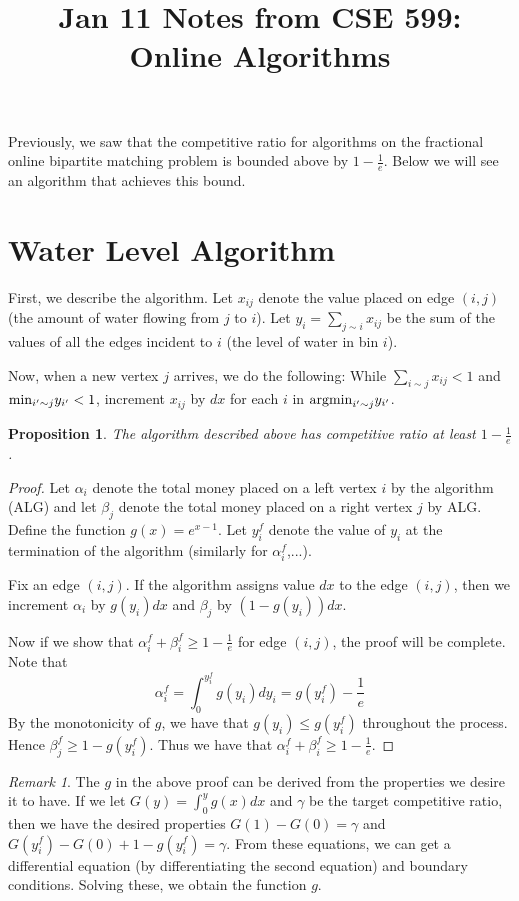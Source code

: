 \documentclass{amsart}
\title{Jan 11 Notes from CSE 599: Online Algorithms}
\newtheorem{proposition}[theorem]{Proposition}
\theoremstyle{definition}
\theoremstyle{remark}
\newtheorem{remark}[theorem]{Remark}
\begin{document}
\maketitle

Previously, we saw that the competitive ratio for algorithms on the fractional online bipartite matching problem is bounded above by $1 - \frac{1}{e}$.  Below we will see an algorithm that achieves this bound.

\section{Water Level Algorithm}

First, we describe the algorithm.  Let $x_{ij}$ denote the value placed on edge $(i,j)$ (the amount of water flowing from $j$ to $i$).  Let $y_i = \sum_{j\sim i} x_{ij}$ be the sum of the values of all the edges incident to $i$ (the level of water in bin $i$).

Now, when a new vertex $j$ arrives, we do the following:  While $\sum_{i\sim j} x_{ij} < 1$ and $\textup{min}_{i' \sim  j} y_{i'} < 1$, increment $x_{ij}$ by $dx$ for each $i$ in $\textup{argmin}_{i' \sim  j} y_{i'}$.

\begin{proposition}
The algorithm described above has competitive ratio at least $1 - \frac{1}{e}$.
\end{proposition}

\begin{proof}
Let $\alpha_i$ denote the total money placed on a left vertex $i$ by the algorithm (ALG) and let $\beta_j$ denote the total money placed on a right vertex $j$ by ALG.  Define the function $g(x) = e^{x-1}$.  Let $y_i^f$ denote the value of $y_i$ at the termination of the algorithm (similarly for $\alpha_i^f$,...).

Fix an edge $(i,j)$.  If the algorithm assigns value $dx$ to the edge $(i,j)$, then we increment $\alpha_i$ by $g(y_i)dx$ and $\beta_j$ by $(1-g(y_i))dx$.

Now if we show that $\alpha_i^f + \beta_i^f \geq 1 - \frac{1}{e}$ for edge $(i,j)$, the proof will be complete.  Note that 
\[ \alpha_i^f = \int_0^{y_i^f} g(y_i) dy_i = g(y_i^f) - \frac{1}{e} \]
By the monotonicity of $g$, we have that $g(y_i) \leq g(y_i^f)$ throughout the process.  Hence $\beta_j^f \geq 1 - g(y_i^f)$.  Thus we have that $\alpha_i^f + \beta_i^f \geq 1 - \frac{1}{e}$.
\end{proof}

\begin{remark}
The $g$ in the above proof can be derived from the properties we desire it to have.  If we let $G(y) = \int_0^y g(x)dx$ and $\gamma$ be the target competitive ratio, then we have the desired properties $G(1) - G(0) = \gamma$ and $G(y_i^f) - G(0) + 1 - g(y_i^f) = \gamma$.  From these equations, we can get a differential equation (by differentiating the second equation) and boundary conditions.  Solving these, we obtain the function $g$.
\end{remark}
\end{document}
